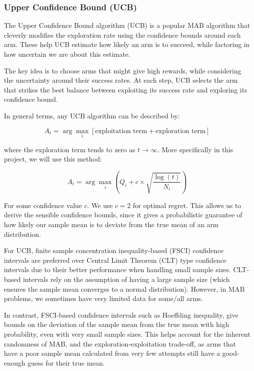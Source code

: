 \subsubsection{Upper Confidence Bound (UCB)}
\label{sec:UCB}


The Upper Confidence Bound algorithm (UCB) is a popular MAB algorithm that cleverly modifies the exploration rate using the confidence bounds around each arm. These help UCB estimate how likely an arm is to succeed, while factoring in how uncertain we are about this estimate.

The key idea is to choose arms that might give high rewards, while considering the uncertainty around their success rates. At each step, UCB selects the arm that strikes the best balance between exploiting its success rate and exploring its confidence bound. 

In general terms, any UCB algorithm can be described by:

$$
A_t = \arg\max_i \left[ \text{exploitation term} + \text{exploration term} \right]
$$

where the exploration term tends to zero as $t \rightarrow \infty$. More specifically in this project, we will use this\cite{Roberts_2021} method:

$$
A_t = \arg\max_i \left( Q_i + c \times \sqrt{\frac{\log(t)}{N_i}} \right)
$$

For some confidence value $c$. We use $c = 2$ for optimal regret. This allows us to derive the sensible confidence bounds, since it gives a probabilistic guarantee of how likely our sample mean is to deviate from the true mean of an arm distribution.

For UCB, finite sample concentration inequality-based (FSCI) confidence intervals are preferred over Central Limit Theorem (CLT) type confidence intervals due to their better performance when handling small sample sizes. CLT-based intervals rely on the assumption of having a large sample size (which ensures the sample mean converges to a normal distribution). However, in MAB problems, we sometimes have very limited data for some/all arms.

In contrast, FSCI-based confidence intervals such as Hoeffding inequality, give bounds on the deviation of the sample mean from the true mean with high probability, even with very small sample sizes. This helps account for the inherent randomness of MAB, and the exploration-exploitation trade-off, as arms that have a poor sample mean calculated from very few attempts still have a good-enough guess for their true mean.

